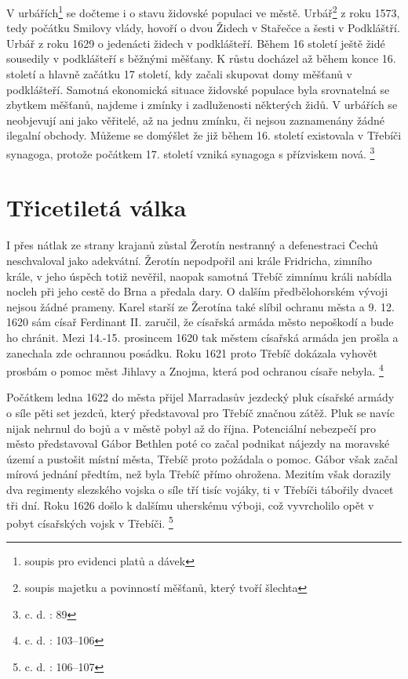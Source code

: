 \documentclass[a4paper,oneside,12p]{report}
\begin{document}
V urbářích\footnote{soupis pro evidenci platů a dávek} se dočteme i o stavu židovské populaci ve městě.
Urbář\footnote{soupis majetku a povinností měšťanů, který tvoří šlechta} z roku 1573, tedy počátku Smilovy vlády, hovoří o dvou Židech v Stařečce a šesti v Podkláštří.
Urbář z roku 1629 o jedenácti židech v podklášteří.
Během 16 století ještě židé sousedily v podklášteří s běžnými měšťany.
K růstu docházel až během konce 16. století a hlavně začátku 17 století, kdy začali skupovat domy měšťanů v podklášteří.
Samotná ekonomická situace židovské populace byla srovnatelná se zbytkem měšťanů, najdeme i zmínky i zadluženosti některých židů.
V urbářích se neobjevují ani jako věřitelé, až na jednu zmínku, či nejsou zaznamenány žádné ilegalní obchody.
Můžeme se domýšlet že již během 16. století existovala v Třebíči synagoga, protože počátkem 17. století vzniká synagoga s přízviskem nová. \footnote{c. d. : 89}

\section{Třicetiletá válka}

I přes nátlak ze strany krajanů zůstal Žerotín nestranný a defenestraci Čechů neschvaloval jako adekvátní.
Žerotín nepodpořil ani krále Fridricha, zimního krále, v jeho úspěch totiž nevěřil, naopak samotná Třebíč zimnímu králi nabídla nocleh při jeho cestě do Brna a předala dary.
O dalším předbělohorském vývoji nejsou žádné prameny.
Karel starší ze Žerotína také slíbil ochranu města a 9. 12. 1620 sám císař Ferdinant II. zaručil, že císařská armáda město nepoškodí a bude ho chránit.
Mezi 14.-15. prosincem 1620 tak městem císařská armáda jen prošla a zanechala zde ochrannou posádku.
Roku 1621 proto Třebíč dokázala vyhovět prosbám o pomoc měst Jihlavy a Znojma, která pod ochranou císaře nebyla. \footnote{c. d. : 103--106}

Počátkem ledna 1622 do města přijel Marradasův jezdecký pluk císařské armády o síle pěti set jezdců, který představoval pro Třebíč značnou zátěž.
Pluk se navíc nijak nehrnul do bojů a v městě pobyl až do října.
Potenciální nebezpečí pro město představoval Gábor Bethlen poté co začal podnikat nájezdy na moravské území a pustošit místní města, Třebíč proto požádala o pomoc.
Gábor však začal mírová jednání předtím, než byla Třebíč přímo ohrožena.
Mezitím však dorazily dva regimenty slezského vojska o síle tří tisíc vojáky, ti v Třebíči tábořily dvacet tři dní.
Roku 1626 došlo k dalšímu uherskému výboji, což vyvrcholilo opět v pobyt císařských vojsk v Třebíči. \footnote{c. d. : 106--107}
\end{document}
